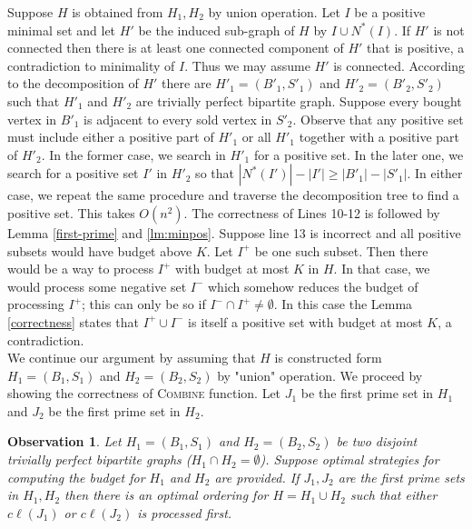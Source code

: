\documentclass[letterpaper,11pt,abstracton]{scrartcl}
\newtheorem{obs}[theorem]{Observation}
\begin{document}
Suppose $H$ is obtained from $H_1,H_2$ by union operation. Let $I$ be a positive minimal set and let $H'$ be the induced sub-graph
of $H$ by $I \cup N^*(I)$. If $H'$ is not connected then there is at least one connected component of $H'$
that is positive, a contradiction to minimality of $I$. Thus we may assume $H'$ is connected. According to the decomposition of $H'$ there are
$H'_1=(B'_1,S'_1)$ and $H'_2=(B'_2,S'_2)$ such that $H'_1$ and $H'_2$ are trivially perfect bipartite graph.
Suppose every bought vertex in $B'_1$ is adjacent to every sold vertex in $S'_2$.
 Observe that  any positive set must include either a positive part of $H'_1$ or all $H'_1$ together with a positive part of $H'_2$.
In the former case, we search in $H'_1$ for a positive set. In the later one, we search for a positive set $I'$ in $H'_2$
so that $|N^*(I')|-|I'|\geq |B'_1|-|S'_1|$. In either case, we repeat the same procedure and
traverse the decomposition tree to find a positive set. This takes $O(n^2)$. The correctness of Lines 10-12 is followed by Lemma 
\ref{first-prime} and \ref{lm:minpos}. 
Suppose line 13 is incorrect and all positive subsets would have budget above $K$.
Let $I^+$ be one such subset. Then there would be a
way to process $I^+$ with budget at most $K$ in $H$. In that case, we would process some negative set
$I^-$ which somehow reduces the budget of processing $I^+$; this can
only be so if $I^-\cap I^+ \neq \emptyset$. In this case the Lemma
\ref{correctness} states that $I^+ \cup I^-$
is itself a positive set with budget at most $K$, a contradiction.\\





We continue our argument by assuming that $H$ is constructed form $H_1=(B_1,S_1)$ and $H_2=(B_2,S_2)$ by "union" operation.
We proceed by showing the correctness of \textsc{Combine} function. Let $J_1$ be the first
prime set in $H_1$ and $J_2$ be the first prime set in $H_2$. 



\begin{obs}
 Let $H_1=(B_1,S_1)$ and $H_2=(B_2,S_2)$ be two disjoint trivially perfect bipartite graphs ($H_1\cap H_2=\emptyset$). Suppose optimal
strategies for computing the budget for $H_1$ and $H_2$ are provided.  If $J_1, J_2$ are the first prime sets in $H_1,H_2$ then there is an optimal
ordering for $H=H_1\cup H_2$ such that either $c\ell(J_1)$ or $c\ell(J_2)$ is processed first. 
\end{obs}
\end{document}
